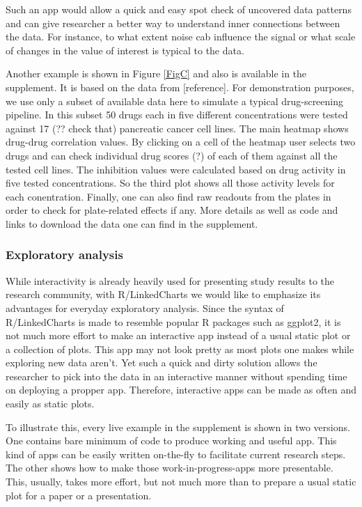 \documentclass[twocolumn,10pt]{article}
\begin{document}
Such an app would allow a quick and easy spot check of uncovered data patterns and can give researcher a better way to understand inner connections between the data. For instance, to what extent noise cab influence the signal or what scale of changes in the value of interest is typical to the data.

Another example is shown in Figure \ref{FigC} and also is available in the supplement. It is based on the data from [reference].
For demonstration purposes, we use only a subset of available data here to simulate a typical drug-screening pipeline. In this subset 50 drugs each in five different concentrations were tested against 17 (?? check that) pancreatic cancer cell lines. The main heatmap shows drug-drug correlation values. By clicking on a cell of the heatmap user selects two drugs and can check individual drug scores (?) of each of them against all the tested cell lines. The inhibition values were calculated based on drug activity in five tested concentrations. So the third plot shows all those activity levels for each conentration. Finally, one can also find raw readouts from the plates in order to check for plate-related effects if any. More details as well as code and links to download the data one can find in the supplement.

\subsubsection{Exploratory analysis}

While interactivity is already heavily used for presenting study results to the research community, with R/LinkedCharts we would like to emphasize its advantages for everyday exploratory analysis. Since the syntax of R/LinkedCharts is made to resemble popular R packages such as ggplot2, it is not much more effort to make an interactive app instead of a usual static plot or a collection of plots. This app may not look pretty as most plots one makes while exploring new data aren't. Yet such a quick and dirty solution allows the researcher to pick into the data in an interactive manner without spending time on deploying a propper app. Therefore, interactive apps can be made as often and easily as static plots.

To illustrate this, every live example in the supplement is shown in two versions. One contains bare minimum of code to produce working and useful app. This kind of apps can be easily written on-the-fly to facilitate current research steps. The other shows how to make those work-in-progress-apps more presentable. This, usually, takes more effort, but not much more than to prepare a usual static plot for a paper or a presentation.
\end{document}
